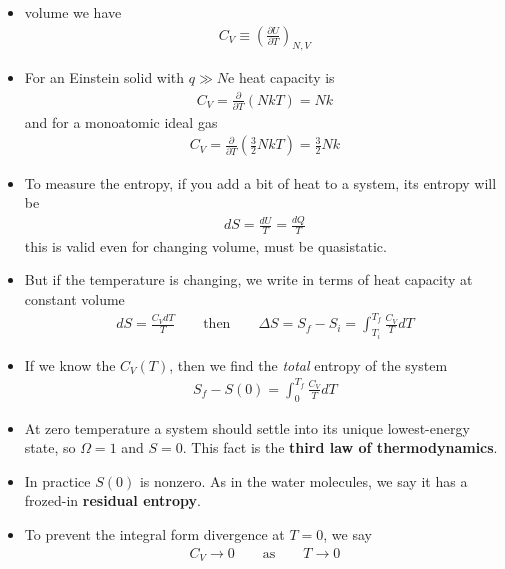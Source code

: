 \documentclass{book}
\begin{document}
\begin{itemize}
	\item	volume we have
	      \begin{align}
		      C_V \equiv \left( \frac{\partial U}{\partial T} \right)_{N,V}
	      \end{align}
	\item For an Einstein solid with $ q \gg N $e heat capacity is
	      \begin{align}
		      C_V = \frac{\partial }{\partial T} (NkT)  = Nk
	      \end{align}
	      and for a monoatomic ideal gas
	      \begin{align}
		      C_V = \frac{\partial }{\partial T} \left( \frac{3}{2} NkT \right) = \frac{3}{2} Nk
	      \end{align}

	\item To measure the entropy, if you add a bit of heat to a system, its entropy will be
	      \begin{align}
		      dS = \frac{dU}{T} = \frac{dQ}{T}
	      \end{align}
	      this is valid even for changing volume, must be quasistatic.
	\item But if the temperature is changing, we write in terms of heat capacity at constant volume
	      \begin{align}
		      dS = \frac{C_V dT}{T} \qquad \text{then} \qquad
		      \Delta{S} = S_f - S_i = \int_{T_i}^{T_f} \frac{C_{V}}{T} dT
	      \end{align}
	\item If we know the $C_{V}(T)$, then we find the \textit{total} entropy of the system
	      \begin{align}
		      S_f - S(0) = \int_{0}^{T_f} \frac{C_V}{T} dT
	      \end{align}
	\item At zero temperature a system should settle into its unique lowest-energy state,
	      so $ \Omega=1 $ and $ S=0 $. This fact is the \textbf{third law of thermodynamics}.
	\item In practice $ S(0) $ is nonzero. As in the water molecules, we say it has a frozed-in \textbf{residual entropy}.
	\item To prevent the integral form divergence at $ T=0 $, we say
	      \begin{align}
		      C_{V} \to 0 \qquad \text{as} \qquad T \to 0
	      \end{align}
\end{itemize}
\end{document}
